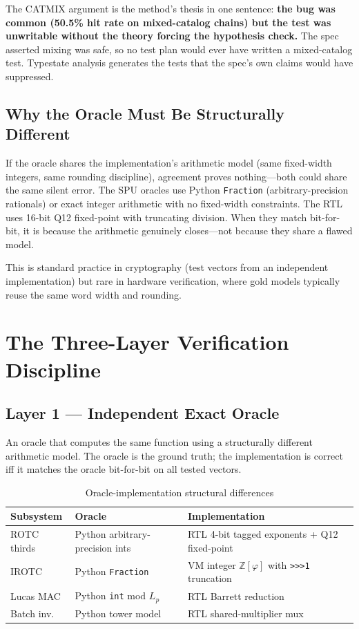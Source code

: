 \documentclass[conference]{IEEEtran}
\begin{document}
The CATMIX argument is the method's thesis in one sentence: \textbf{the bug
was common (50.5\% hit rate on mixed-catalog chains) but the test was
unwritable without the theory forcing the hypothesis check.}  The spec asserted
mixing was safe, so no test plan would ever have written a mixed-catalog test.
Typestate analysis generates the tests that the spec's own claims would have
suppressed.

\subsection{Why the Oracle Must Be Structurally Different}

If the oracle shares the implementation's arithmetic model (same fixed-width
integers, same rounding discipline), agreement proves nothing---both could
share the same silent error.  The SPU oracles use Python \texttt{Fraction}
(arbitrary-precision rationals) or exact integer arithmetic with no fixed-width
constraints.  The RTL uses 16-bit Q12 fixed-point with truncating division.
When they match bit-for-bit, it is because the arithmetic genuinely closes---not
because they share a flawed model.

This is standard practice in cryptography (test vectors from an independent
implementation) but rare in hardware verification, where gold models typically
reuse the same word width and rounding.

\section{The Three-Layer Verification Discipline}

\subsection{Layer 1 --- Independent Exact Oracle}

An oracle that computes the same function using a structurally different
arithmetic model.  The oracle is the ground truth; the implementation is
correct iff it matches the oracle bit-for-bit on all tested vectors.

\begin{table}[h]
\centering
\caption{Oracle-implementation structural differences}
\label{tab:oracles}
\begin{tabular}{p{1.8cm}p{2.2cm}p{2.2cm}}
\toprule
\textbf{Subsystem} & \textbf{Oracle} & \textbf{Implementation} \\
\midrule
ROTC thirds & Python arbitrary-precision ints & RTL 4-bit tagged exponents +
Q12 fixed-point \\
IROTC & Python \texttt{Fraction} & VM integer $\mathbb{Z}[\varphi]$ with
\texttt{>{}>{}>1} truncation \\
Lucas MAC & Python \texttt{int} mod $L_p$ & RTL Barrett reduction \\
Batch inv. & Python tower model & RTL shared-multiplier mux \\
\bottomrule
\end{tabular}
\end{table}
\end{document}
